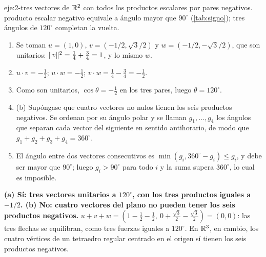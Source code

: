 \begin{solucion}{eje:2-tres}
\datos vectores de $\mathbb{R}^{2}$ con todos los productos escalares por pares negativos.
\planteamiento producto escalar negativo equivale a ángulo mayor que $90^\circ$ (\cref{tab:signo}); tres ángulos de $120^\circ$ completan la vuelta.
\pasos
\begin{enumerate}[label=\arabic*.]
  \item Se toman $u=(1,0)$, $v=(-1/2,\sqrt3/2)$ y $w=(-1/2,-\sqrt3/2)$, que son unitarios: $\lVert v\rVert^{2}=\tfrac14+\tfrac34=1$, y lo mismo $w$.
  \item $u\cdot v=-\tfrac12$; $u\cdot w=-\tfrac12$; $v\cdot w=\tfrac14-\tfrac34=-\tfrac12$.
  \item Como son unitarios, $\cos\theta=-\tfrac12$ en los tres pares, luego $\theta=120^\circ$.
  \item (b) Supóngase que cuatro vectores no nulos tienen los seis productos negativos. Se ordenan por su ángulo polar y se llaman $g_1,\dots,g_4$ los ángulos que separan cada vector del siguiente en sentido antihorario, de modo que $g_1+g_2+g_3+g_4=360^\circ$.
  \item El ángulo entre dos vectores consecutivos es $\min(g_i,360^\circ-g_i)\le g_i$, y debe ser mayor que $90^\circ$; luego $g_i>90^\circ$ para todo $i$ y la suma supera $360^\circ$, lo cual es imposible.
\end{enumerate}
\resultado \textbf{(a) Sí: tres vectores unitarios a $120^\circ$, con los tres productos iguales a $-1/2$. (b) No: cuatro vectores del plano no pueden tener los seis productos negativos.}
\comprobacion $u+v+w=(1-\tfrac12-\tfrac12,\ 0+\tfrac{\sqrt3}{2}-\tfrac{\sqrt3}{2})=(0,0)$: las tres flechas se equilibran, como tres fuerzas iguales a $120^\circ$. En $\mathbb{R}^{3}$, en cambio, los cuatro vértices de un tetraedro regular centrado en el origen sí tienen los seis productos negativos.
\end{solucion}

